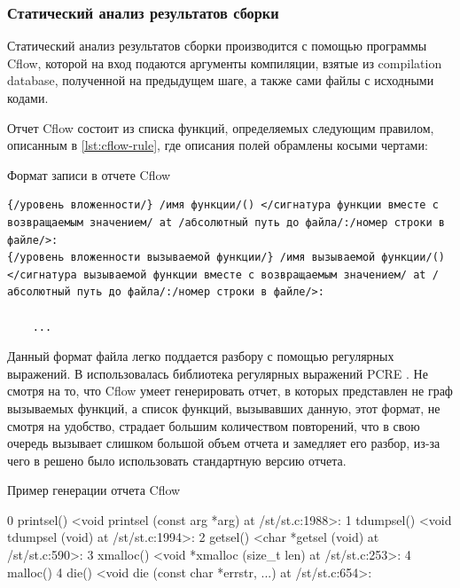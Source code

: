 \subsubsection{Статический анализ результатов сборки}\label{sec:ch2/sec2/sub3/sub2}
Статический анализ результатов сборки производится с помощью программы Cflow, которой на вход
подаются аргументы компиляции, взятые из compilation database, полученной на предыдущем шаге,
а также сами файлы с исходными кодами.

Отчет Cflow состоит из списка функций, определяемых следующим правилом, описанным в \autoref{lst:cflow-rule},
где описания полей обрамлены косыми чертами:

\begin{ListingEnv}[!h]
    \captiondelim{ }
    \caption{Формат записи в отчете Cflow}\label{lst:cflow-rule}
    \begin{lstlisting}[]
{/уровень вложенности/} /имя функции/() </сигнатура функции вместе с возвращаемым значением/ at /абсолютный путь до файла/:/номер строки в файле/>:
{/уровень вложенности вызываемой функции/} /имя вызываемой функции/() </сигнатура вызываемой функции вместе с возвращаемым значением/ at /абсолютный путь до файла/:/номер строки в файле/>:

    ... 
    \end{lstlisting}
\end{ListingEnv}

Данный формат файла легко поддается разбору с помощью регулярных выражений. В {\ProgModule} использовалась
библиотека регулярных выражений PCRE \autocite{pcre}.
Не смотря на то, что Cflow умеет генерировать отчет, в которых представлен не граф вызываемых функций,
а список функций, вызывавших данную, этот формат, не смотря на удобство, страдает большим количеством
повторений, что в свою очередь вызывает слишком большой объем отчета и замедляет его разбор, из-за
чего в {\ProgModule} решено было использовать стандартную версию отчета.

\begin{ListingEnv}[!h]
    \captiondelim{ }
    \caption{Пример генерации отчета Cflow}\label{lst:cflow-example}
    \begin{Verb}[]
{   0} printsel() <void printsel (const arg *arg) at /st/st.c:1988>:
{   1}  tdumpsel() <void tdumpsel (void) at /st/st.c:1994>:
{   2}    getsel() <char *getsel (void) at /st/st.c:590>:
{   3}      xmalloc() <void *xmalloc (size_t len) at /st/st.c:253>:
{   4}        malloc()
{   4}        die() <void die (const char *errstr, ...) at /st/st.c:654>:
    \end{Verb}
\end{ListingEnv}

